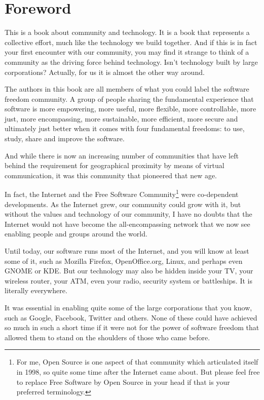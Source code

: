 \section*{Foreword}

This is a book about community and technology. It is a book that
represents a collective effort, much like the technology we build
together. And if this is in fact your first encounter with our
community, you may find it strange to think of a community as the
driving force behind technology. Isn't technology built by large
corporations? Actually, for us it is almost the other way around.

The authors in this book are all members of what you could label the
software freedom community. A group of people sharing the fundamental
experience that software is more empowering, more useful, more
flexible, more controllable, more just, more encompassing, more
sustainable, more efficient, more secure and ultimately just better
when it comes with four fundamental freedoms: to use, study, share and
improve the software.

And while there is now an increasing number of communities that have left
behind the requirement for geographical proximity by means of virtual
communication, it was this community that pioneered that new age. 

In fact, the Internet and the Free Software Community\footnote{For me,
  Open Source is one aspect of that community which articulated itself
  in 1998, so quite some time after the Internet came about. But
  please feel free to replace Free Software by Open Source in your
  head if that is your preferred terminology.}  were co-dependent
developments. As the Internet grew, our community could grow with it,
but without the values and technology of our community, I have no doubts
that the Internet would not have become the
all-encompassing network that we now see enabling people and groups
around the world.

Until today, our software runs most of the Internet, and you will know
at least some of it, such as Mozilla Firefox,
OpenOffice.org, Linux, and perhaps even GNOME or KDE. But our
technology may also be hidden inside your TV, your wireless
router, your ATM, even your radio, security system or battleships. It
is literally everywhere. 

It was essential in enabling quite some of the large corporations
that you know, such as Google, Facebook, Twitter and others. None of
these could have achieved so much in such a short time if it were not
for the power of software freedom that allowed them to stand on the
shoulders of those who came before.

